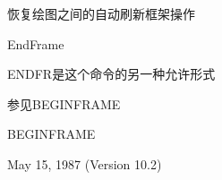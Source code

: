 \label{cmd:endframe}

恢复绘图之间的自动刷新框架操作

EndFrame

ENDFR是这个命令的另一种允许形式

参见BEGINFRAME

BEGINFRAME

May 15, 1987 (Version 10.2)
